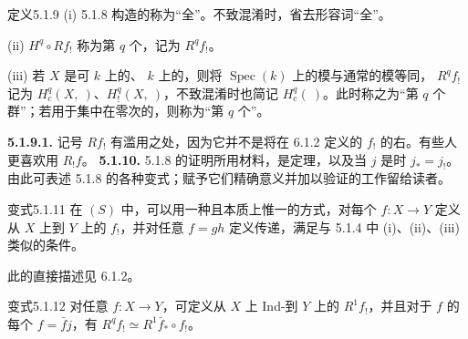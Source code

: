 \begin{SGAresult}{定义}{5.1.9}
(i) 5.1.8 构造的称为“全”。不致混淆时，省去形容词“全”。

(ii)  $H^q\circ Rf_!$ 称为第 $q$ 个，记为 $R^qf_!$。

(iii) 若 $X$ 是可 $k$ 上的、 $k$ 上的，则将 $\operatorname{Spec}(k)$ 上的模与通常的模等同， $R^qf_!$ 记为 $H_c^q(X,\ )$、$H_!^q(X,\ )$，不致混淆时也简记 $H_c^q(\ )$。此时称之为“第 $q$ 个群”；若用于集中在零次的，则称为“第 $q$ 个”。
\end{SGAresult}
\textbf{5.1.9.1.} 记号 $Rf_!$ 有滥用之处，因为它并不是将在 6.1.2 定义的 $f_!$ 的右。有些人更喜欢用 $R_!f$。
\textbf{5.1.10.} 5.1.8 的证明所用材料，是定理，以及当 $j$ 是时 $j_*=j_!$。由此可表述 5.1.8 的各种变式；赋予它们精确意义并加以验证的工作留给读者。
\begin{SGAresult}{变式}{5.1.11}
在 $(S)$ 中，可以用一种且本质上惟一的方式，对每个 $f:X\to Y$ 定义从 $X$ 上到 $Y$ 上的 $f_!$，并对任意 $f=gh$ 定义传递，满足与 5.1.4 中 (i)、(ii)、(iii) 类似的条件。
\end{SGAresult}
此的直接描述见 6.1.2。
\begin{SGAresult}{变式}{5.1.12}
对任意 $f:X\to Y$，可定义从 $X$ 上 Ind-到 $Y$ 上的 $R^1f_!$，并且对于 $f$ 的每个 $f=\bar f j$，有 $R^qf_!\simeq R^1\bar f_*\circ f_!$。
\end{SGAresult}
